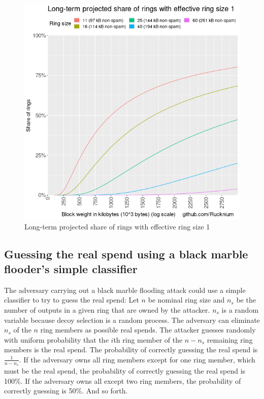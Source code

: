 \documentclass[usletter,11pt,english,openany]{article}
\begin{document}
\begin{figure}[H]
\caption{Long-term projected share of rings with effective ring size 1}
\label{fig-projected-share-ring-size-one}
\centering{}\includegraphics[scale=0.5]{images/projected-ring-size-one}
\end{figure}


\subsection{Guessing the real spend using a black marble flooder's simple classifier}

The adversary carrying out a black marble flooding attack could use
a simple classifier to try to guess the real spend: Let $n$ be nominal
ring size and $n_{s}$ be the number of outputs in a given ring that
are owned by the attacker. $n_{s}$ is a random variable because decoy
selection is a random process. The adversary can eliminate $n_{s}$
of the $n$ ring members as possible real spends. The attacker guesses
randomly with uniform probability that the $i$th ring member of the
$n-n_{s}$ remaining ring members is the real spend. The probability
of correctly guessing the real spend is $\frac{1}{n-n_{s}}$. If the
adversary owns all ring members except for one ring member, which
must be the real spend, the probability of correctly guessing the
real spend is 100\%. If the adversary owns all except two ring members,
the probability of correctly guessing is 50\%. And so forth.
\end{document}
